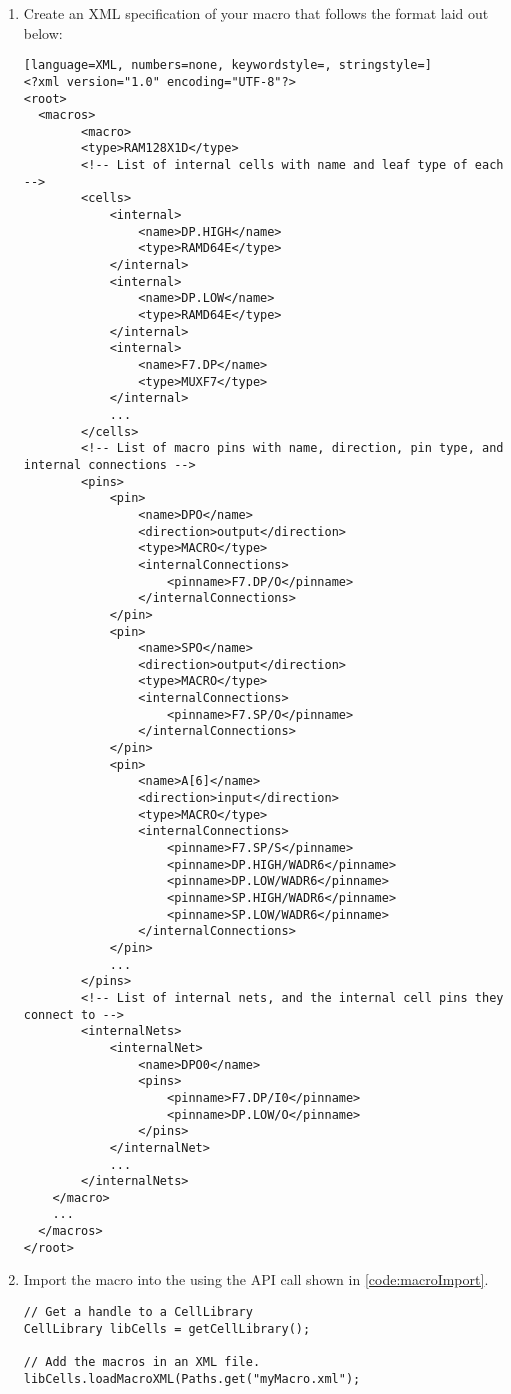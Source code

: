 \begin {enumerate}
  \item Create an XML specification
  of your macro that follows the format laid out below: 

\begin{lstlisting}[language=XML, numbers=none, keywordstyle=, stringstyle=]
<?xml version="1.0" encoding="UTF-8"?>
<root>	
  <macros>    
		<macro>
        <type>RAM128X1D</type>
        <!-- List of internal cells with name and leaf type of each -->
        <cells>
            <internal>
                <name>DP.HIGH</name>
                <type>RAMD64E</type>
            </internal>
            <internal>
                <name>DP.LOW</name>
                <type>RAMD64E</type>
            </internal>
            <internal>
                <name>F7.DP</name>
                <type>MUXF7</type>
            </internal>
			...
        </cells>
        <!-- List of macro pins with name, direction, pin type, and internal connections --> 
        <pins>
            <pin>
                <name>DPO</name>
                <direction>output</direction>
                <type>MACRO</type>
                <internalConnections>
                    <pinname>F7.DP/O</pinname>
                </internalConnections>
            </pin>
            <pin>
                <name>SPO</name>
                <direction>output</direction>
                <type>MACRO</type>
                <internalConnections>
                    <pinname>F7.SP/O</pinname>
                </internalConnections>
            </pin>
            <pin>
                <name>A[6]</name>
                <direction>input</direction>
                <type>MACRO</type>
                <internalConnections>
                    <pinname>F7.SP/S</pinname>
                    <pinname>DP.HIGH/WADR6</pinname>
                    <pinname>DP.LOW/WADR6</pinname>
                    <pinname>SP.HIGH/WADR6</pinname>
                    <pinname>SP.LOW/WADR6</pinname>
                </internalConnections>
            </pin>
            ...
        </pins>
        <!-- List of internal nets, and the internal cell pins they connect to --> 
        <internalNets>
            <internalNet>
                <name>DPO0</name>
                <pins>
                    <pinname>F7.DP/I0</pinname>
                    <pinname>DP.LOW/O</pinname>
                </pins>
            </internalNet>
            ...
        </internalNets>
    </macro>
	...
  </macros>
</root>
\end{lstlisting}

  \item Import the macro into the  using the API call shown in
  \autoref{code:macroImport}.

\begin{lstlisting}[caption=Adding new macros to the Cell Library,
label=code:macroImport] 
// Get a handle to a CellLibrary
CellLibrary libCells = getCellLibrary();

// Add the macros in an XML file.
libCells.loadMacroXML(Paths.get("myMacro.xml"); 
\end{lstlisting}

\end{enumerate}

